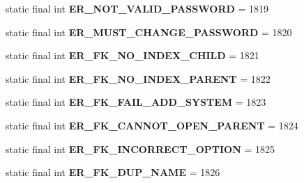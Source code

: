 \begin{DoxyCompactItemize}
static final int {\bfseries E\+R\+\_\+\+N\+O\+T\+\_\+\+V\+A\+L\+I\+D\+\_\+\+P\+A\+S\+S\+W\+O\+RD} = 1819
\item 
\mbox{\label{classcom_1_1mysql_1_1jdbc_1_1_mysql_error_numbers_a0043085a4769f6f851d70e23fb0af35d}} 
static final int {\bfseries E\+R\+\_\+\+M\+U\+S\+T\+\_\+\+C\+H\+A\+N\+G\+E\+\_\+\+P\+A\+S\+S\+W\+O\+RD} = 1820
\item 
\mbox{\label{classcom_1_1mysql_1_1jdbc_1_1_mysql_error_numbers_aaf56dd4c44dbcf4acea3312dd0e18c21}} 
static final int {\bfseries E\+R\+\_\+\+F\+K\+\_\+\+N\+O\+\_\+\+I\+N\+D\+E\+X\+\_\+\+C\+H\+I\+LD} = 1821
\item 
\mbox{\label{classcom_1_1mysql_1_1jdbc_1_1_mysql_error_numbers_aa9b5891cf7c08c18037b827f4367aef0}} 
static final int {\bfseries E\+R\+\_\+\+F\+K\+\_\+\+N\+O\+\_\+\+I\+N\+D\+E\+X\+\_\+\+P\+A\+R\+E\+NT} = 1822
\item 
\mbox{\label{classcom_1_1mysql_1_1jdbc_1_1_mysql_error_numbers_a6fc2ed667cc1baaa6c4d1d45cb5ea6e2}} 
static final int {\bfseries E\+R\+\_\+\+F\+K\+\_\+\+F\+A\+I\+L\+\_\+\+A\+D\+D\+\_\+\+S\+Y\+S\+T\+EM} = 1823
\item 
\mbox{\label{classcom_1_1mysql_1_1jdbc_1_1_mysql_error_numbers_a34d4f10b8086c4615c72b202dd43f816}} 
static final int {\bfseries E\+R\+\_\+\+F\+K\+\_\+\+C\+A\+N\+N\+O\+T\+\_\+\+O\+P\+E\+N\+\_\+\+P\+A\+R\+E\+NT} = 1824
\item 
\mbox{\label{classcom_1_1mysql_1_1jdbc_1_1_mysql_error_numbers_ab9f581f10605779778ddc5aac4f2a6b1}} 
static final int {\bfseries E\+R\+\_\+\+F\+K\+\_\+\+I\+N\+C\+O\+R\+R\+E\+C\+T\+\_\+\+O\+P\+T\+I\+ON} = 1825
\item 
\mbox{\label{classcom_1_1mysql_1_1jdbc_1_1_mysql_error_numbers_ae5609feec7283efe39eb118e4e2f60d8}} 
static final int {\bfseries E\+R\+\_\+\+F\+K\+\_\+\+D\+U\+P\+\_\+\+N\+A\+ME} = 1826
\item 

\end{DoxyCompactItemize}
